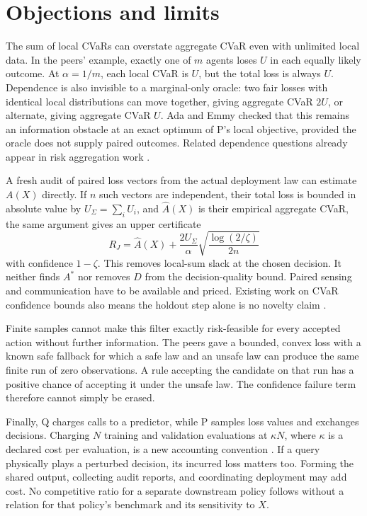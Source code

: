 \documentclass{article}
\begin{document}
\section{Objections and limits}

The sum of local CVaRs can overstate aggregate CVaR even with unlimited local data. In the peers' example,
exactly one of \(m\) agents loses \(U\) in each equally likely outcome. At \(\alpha=1/m\), each local CVaR is
\(U\), but the total loss is always \(U\). Dependence is also invisible to a marginal-only oracle: two fair
losses with identical local distributions can move together, giving aggregate CVaR \(2U\), or alternate,
giving aggregate CVaR \(U\). Ada and Emmy checked that this remains an information obstacle at an exact
optimum of P's local objective, provided the oracle does not supply paired outcomes. Related dependence
questions already appear in risk aggregation work \cite{cheung2010}.

A fresh audit of paired loss vectors from the actual deployment law can estimate \(A(X)\) directly. If \(n\)
such vectors are independent, their total loss is bounded in absolute value by \(U_\Sigma=\sum_i U_i\), and
\(\widehat A(X)\) is their empirical aggregate CVaR, the same argument gives an upper certificate
\[
R_J=\widehat A(X)+\frac{2U_\Sigma}{\alpha}
\sqrt{\frac{\log(2/\zeta)}{2n}}
\]
with confidence \(1-\zeta\). This removes local-sum slack at the chosen decision. It neither finds \(A^*\) nor
removes \(D\) from the decision-quality bound. Paired sensing and communication have to be available and
priced. Existing work on CVaR confidence bounds also means the holdout step alone is no novelty claim
\cite{liang2023,torossian2019}.

Finite samples cannot make this filter exactly risk-feasible for every accepted action without further
information. The peers gave a bounded, convex loss with a known safe fallback for which a safe law and an
unsafe law can produce the same finite run of zero observations. A rule accepting the candidate on that run
has a positive chance of accepting it under the unsafe law. The confidence failure term therefore cannot
simply be erased.

Finally, Q charges calls to a predictor, while P samples loss values and exchanges decisions. Charging \(N\)
training and validation evaluations at \(\kappa N\), where \(\kappa\) is a declared cost per evaluation, is a
new accounting convention \cite{Q,P}. If a query physically plays a perturbed decision, its incurred loss
matters too. Forming the shared output, collecting audit reports, and coordinating deployment may add cost. No
competitive ratio for a separate downstream policy follows without a relation for that policy's benchmark and
its sensitivity to \(X\).
\end{document}
